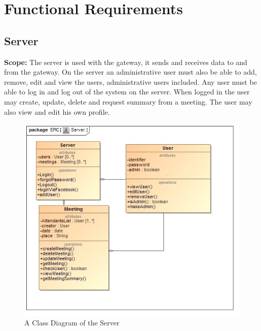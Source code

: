 \documentclass{article}
\begin{document}
\newpage
	\section{Functional Requirements}
	
		\subsection{Server}
		\textbf{Scope: } 	The server is used with the gateway, it sends and receives data to and from the gateway. On the server an administrative user must also be able to add, remove, edit and view the users, administrative users included. Any user must be able to log in and log out of the system on the server. When logged in the user may create, update, delete and request summary from a meeting. The user may also view and edit his own profile.
		\begin{figure}[H]
 			 \centering
			  \includegraphics[width=12cm]{ServerClass}
		 	 \caption{A Class Diagram of the Server}
		\end{figure}
\end{document}
